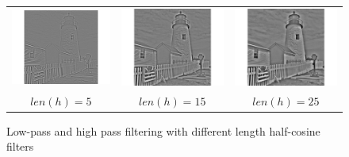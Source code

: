\documentclass{article}					%
\begin{document}
\begin{figure}[ht!]
\begin{centering}
\begin{tabular}{c c c}
  \includegraphics{11} & \includegraphics{9} & \includegraphics{13}\\
  $len(h) = 5$ & $len(h) = 15$ & $len(h) = 25$\\
\end{tabular}
\caption{Low-pass and high pass filtering with different length half-cosine filters}
\end{centering}
\end{figure}
\end{document}
